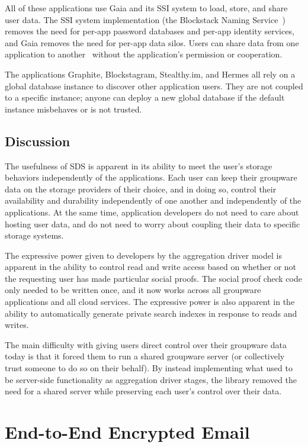 All of these applications use Gaia and its SSI system to load, store, and share
user data.  The SSI system implementation (the Blockstack Naming
Service~\cite{bns}) removes the need for per-app password databases and per-app
identity services, and Gaia removes the need for per-app data silos.  Users can
share data from one application to
another~\cite{blockstack-technical-faq-share-data} without the application's
permission or cooperation.

The applications Graphite, Blockstagram, Stealthy.im, and Hermes all rely on a
global database instance to discover other application users.  They are not
coupled to a specific instance; anyone can deploy a new global database if the
default instance misbehaves or is not trusted.

\subsection{Discussion}

The usefulness of SDS is apparent in its ability to meet the user's storage behaviors
independently of the applications.  Each user can keep their groupware data on
the storage providers of their choice, and in doing so, control their
availability and durability independently of one another and independently of
the applications.  At the same time, application developers do not need to care
about hosting user data, and do not need to worry about coupling their data to
specific storage systems.

The expressive power given to developers by the aggregation driver model is
apparent in the ability to control read and write access based on whether or not
the requesting user has made particular social proofs. The social proof check
code only needed to be written once, and it now works across all groupware
applications and all cloud services.  The expressive power is also apparent in
the ability to automatically generate private search indexes in response to reads and
writes.

The main difficulty with giving users direct control over their groupware data
today is that it forced them to run a shared groupware server (or collectively
trust someone to do so on their behalf).  By instead
implementing what used to be server-side functionality as aggregation driver
stages, the library removed the need for a shared server while preserving each
user's control over their data.

\section{End-to-End Encrypted Email}

